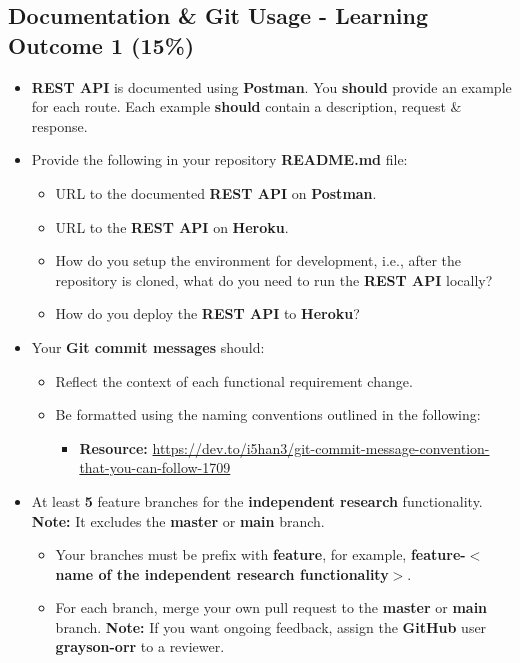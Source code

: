 \documentclass{article}
\begin{document}
\subsection*{Documentation \& Git Usage - Learning Outcome 1 (15\%)}
\begin{itemize}
	\item \textbf{REST API} is documented using \textbf{Postman}. You \textbf{should} provide an example for each route. Each example \textbf{should} contain a description, request \& response.
	\item Provide the following in your repository \textbf{README.md} file:
	      \begin{itemize}
		      \item URL to the documented \textbf{REST API} on \textbf{Postman}.
		      \item URL to the \textbf{REST API} on \textbf{Heroku}.
		      \item How do you setup the environment for development, i.e., after the repository is cloned, what do you need to run the \textbf{REST API} locally?
		      \item How do you deploy the \textbf{REST API} to \textbf{Heroku}?
	      \end{itemize}
	\item Your \textbf{Git commit messages} should:
	      \begin{itemize}
		      \item Reflect the context of each functional requirement change.
		      \item Be formatted using the naming conventions outlined in the following:
		            \begin{itemize}
			            \item \textbf{Resource:} \small\href{https://dev.to/i5han3/git-commit-message-convention-that-you-can-follow-1709}{https://dev.to/i5han3/git-commit-message-convention-that-you-can-follow-1709}
		            \end{itemize}
	      \end{itemize}
	\item At least \textbf{5} feature branches for the \textbf{independent research} functionality. \textbf{Note:} It excludes the \textbf{master} or \textbf{main} branch.
	      \begin{itemize}
		      \item Your branches must be prefix with \textbf{feature}, for example, \textbf{feature-$<$name of the independent research functionality$>$}.
		      \item For each branch, merge your own pull request to the \textbf{master} or \textbf{main} branch. \textbf{Note:} If you want ongoing feedback, assign the \textbf{GitHub} user \textbf{grayson-orr} to a reviewer.
	      \end{itemize}
\end{itemize}
\end{document}
